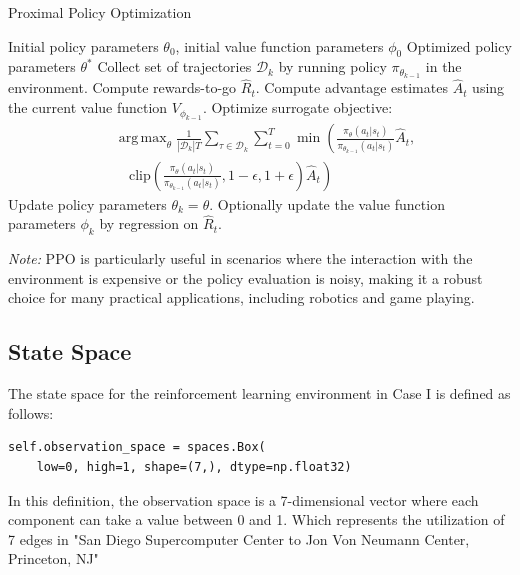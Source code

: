 \documentclass[conference]{IEEEtran}
\DeclareMathOperator*{\argmax}{arg\,max}
\begin{document}
\begin{algorithm}[H]
\caption{Proximal Policy Optimization}
\begin{algorithmic}
\REQUIRE Initial policy parameters $\theta_0$, initial value function parameters $\phi_0$
\ENSURE Optimized policy parameters $\theta^*$
    \STATE Collect set of trajectories $\mathcal{D}_k$ by running policy $\pi_{\theta_{k-1}}$ in the environment.
    \STATE Compute rewards-to-go $\hat{R}_t$.
    \STATE Compute advantage estimates $\hat{A}_t$ using the current value function $V_{\phi_{k-1}}$.
    \STATE Optimize surrogate objective:
    \begin{equation}
    \begin{aligned}
        & \argmax_{\theta} \frac{1}{|\mathcal{D}_k| T} \sum_{\tau \in \mathcal{D}_k} \sum_{t=0}^T \min \left( \frac{\pi_\theta(a_t | s_t)}{\pi_{\theta_{k-1}}(a_t | s_t)} \hat{A}_t, \right. \\
        & \quad \left. \text{clip}\left(\frac{\pi_\theta(a_t | s_t)}{\pi_{\theta_{k-1}}(a_t | s_t)}, 1-\epsilon, 1+\epsilon\right) \hat{A}_t \right)
    \end{aligned}
    \end{equation}
    \STATE Update policy parameters $\theta_k = \theta$.
    \STATE Optionally update the value function parameters $\phi_k$ by regression on $\hat{R}_t$.
\ENDFOR
\end{algorithmic}
\end{algorithm}

\textit{Note:} PPO is particularly useful in scenarios where the interaction with the environment is expensive or the policy evaluation is noisy, making it a robust choice for many practical applications, including robotics and game playing.

\subsection{State Space}
The state space for the reinforcement learning environment in Case I is defined as follows:
\begin{verbatim}
self.observation_space = spaces.Box(
    low=0, high=1, shape=(7,), dtype=np.float32)
\end{verbatim}
In this definition, the observation space is a 7-dimensional vector where each component can take a value between 0 and 1. Which represents the utilization of 7 edges in "San Diego Supercomputer Center to Jon Von Neumann Center, Princeton, NJ"
\end{document}
